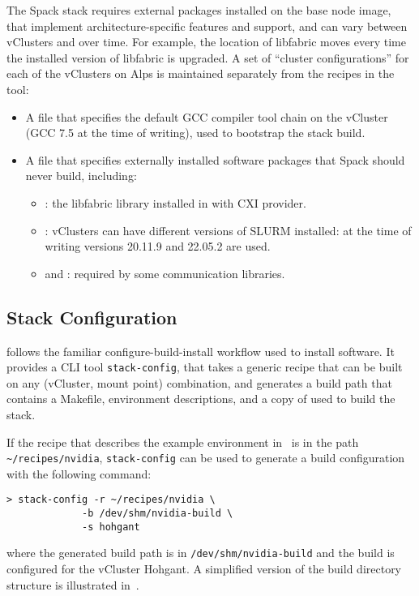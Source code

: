 The Spack stack requires external packages installed on the base node image, that implement architecture-specific features and support, and can vary between vClusters and over time.
For example, the location of libfabric moves every time the installed version of libfabric is upgraded. 
A set of ``cluster configurations'' for each of the vClusters on Alps is maintained separately from the recipes in the \stackinator tool:
\begin{itemize}
    \item A \spack {} file that specifies the default GCC compiler tool chain on the vCluster (GCC 7.5 at the time of writing), used to bootstrap the \spack stack build.
    \item A \spack {} file that specifies externally installed software packages that Spack should never build, including:
    \begin{itemize}
        \item {}: the libfabric library installed in  with CXI provider.
        \item {}: vClusters can have different versions of SLURM installed: at the time of writing versions 20.11.9 and 22.05.2 are used.
        \item {} and : required by some communication libraries.
    \end{itemize}
\end{itemize}

\subsection{Stack Configuration}

\stackinator follows the familiar configure-build-install workflow used to install software.
It provides a CLI tool \lstinline{stack-config}, that takes a generic recipe that can be built on any (vCluster, mount point) combination, and generates a build path that contains a Makefile, \spack environment descriptions, and a copy of \spack used to build the stack.

If the recipe that describes the example environment in~ is in the path \lstinline{~/recipes/nvidia}, \lstinline{stack-config} can be used to generate a build configuration with the following command:
\begin{lstlisting}
> stack-config -r ~/recipes/nvidia \
             -b /dev/shm/nvidia-build \
             -s hohgant
\end{lstlisting}
where the generated build path is in \lstinline{/dev/shm/nvidia-build} and the build is configured for the vCluster Hohgant.
A simplified version of the build directory structure is illustrated in~.

